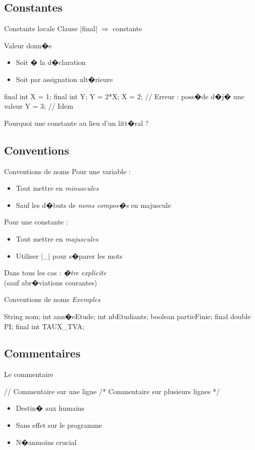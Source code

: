 \subsection{Constantes}

\begin{frame}[fragile]{Constante locale}
Clause \java|final| {} $\Rightarrow$ constante
\par\medskip
Valeur donn�e
  \begin{itemize}
  \item Soit � la d�claration 
  \item Soit par assignation ult�rieure
  \end{itemize} 
\begin{Java}
  final int X = 1;
  final int Y;
  Y = 2*X;
  X = 2; // Erreur : poss�de d�j� une valeur
  Y = 3; // Idem
\end{Java}
Pourquoi une constante au lieu d'un litt�ral ?
\end{frame}

\subsection{Conventions}

\begin{frame}{Conventions de noms}
Pour une variable :
  \begin{itemize}
  \item Tout mettre en \emph{minuscules}
  \item Sauf les d�buts de \textit{noms compos�s} en majuscule
  \end{itemize} 
\medskip
Pour une constante :
  \begin{itemize}
  \item Tout mettre en \emph{majuscules}
  \item Utiliser \java|_|  pour s�parer les mots
  \end{itemize}
\medskip
Dans tous les cas : \emph{�tre explicite}
\\(sauf abr�viations courantes)
\end{frame}

\begin{frame}[fragile]{Conventions de noms}
\emph{Exemples}
\begin{Java}
  String nom;
  int ann�eEtude;
  int nbEtudiants;
  boolean partieFinie;
  final double PI;
  final int TAUX_TVA;   
\end{Java}
\end{frame}

\subsection{Commentaires}

\begin{frame}[fragile]{Le commentaire}
  \begin{Java}
  // Commentaire sur une ligne
  /* Commentaire sur
     plusieurs lignes */
  \end{Java}
\begin{itemize}
\item Destin� aux humains
\item Sans effet sur le programme
\item N�anmoins crucial
\end{itemize}
\end{frame}


